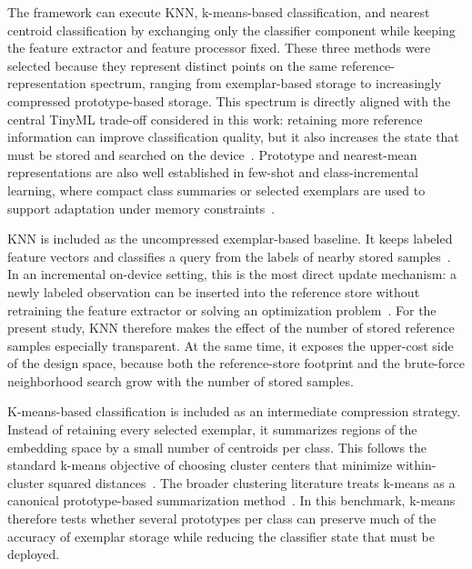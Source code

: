 \documentclass[sigconf,review,nonacm]{acmart}
\begin{document}
The framework can execute KNN, k-means-based classification, and nearest centroid classification by exchanging only the classifier component while keeping the feature extractor and feature processor fixed.
These three methods were selected because they represent distinct points on the same reference-representation spectrum, ranging from exemplar-based storage to increasingly compressed prototype-based storage.
This spectrum is directly aligned with the central TinyML trade-off considered in this work: retaining more reference information can improve classification quality, but it also increases the state that must be stored and searched on the device~\cite{disabato2020incremental,ravaglia2021tinyml}.
Prototype and nearest-mean representations are also well established in few-shot and class-incremental learning, where compact class summaries or selected exemplars are used to support adaptation under memory constraints~\cite{snell2017prototypical,rebuffi2017icarl,mai2021supervised,diao2021generalized}.

KNN is included as the uncompressed exemplar-based baseline.
It keeps labeled feature vectors and classifies a query from the labels of nearby stored samples~\cite{cover1967nearest}.
In an incremental on-device setting, this is the most direct update mechanism: a newly labeled observation can be inserted into the reference store without retraining the feature extractor or solving an optimization problem~\cite{disabato2020incremental}.
For the present study, KNN therefore makes the effect of the number of stored reference samples especially transparent.
At the same time, it exposes the upper-cost side of the design space, because both the reference-store footprint and the brute-force neighborhood search grow with the number of stored samples.

K-means-based classification is included as an intermediate compression strategy.
Instead of retaining every selected exemplar, it summarizes regions of the embedding space by a small number of centroids per class.
This follows the standard k-means objective of choosing cluster centers that minimize within-cluster squared distances~\cite{lloyd1982least,kanungo2002efficient}. The broader clustering literature treats k-means as a canonical prototype-based summarization method~\cite{jain2010clustering}.
In this benchmark, k-means therefore tests whether several prototypes per class can preserve much of the accuracy of exemplar storage while reducing the classifier state that must be deployed.
\end{document}
